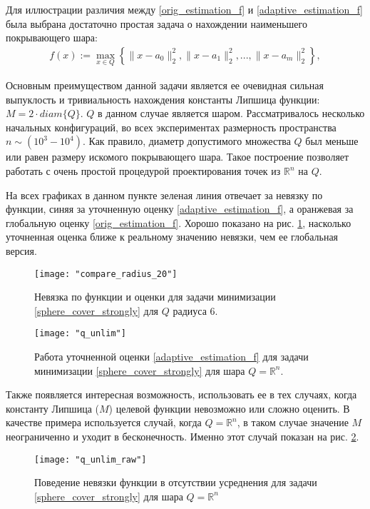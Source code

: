 Для иллюстрации различия между \eqref{orig_estimation_f} и \eqref{adaptive_estimation_f} была выбрана достаточно простая задача о нахождении наименьшего покрывающего шара:
\begin{gather}\label{sphere_cover_strongly}
    f(x) := \max_{x\in Q}\left\{\|x - a_0\|_2^2, \|x - a_1\|_2^2, ..., \|x - a_m\|_2^2\right\},
\end{gather}

Основным преимуществом данной задачи является ее очевидная сильная выпуклость и тривиальность нахождения константы Липшица функции: $ M = 2 \cdot diam\{Q\} $. $Q$ в данном случае является шаром.
Рассматривалось несколько начальных конфигураций, во всех экспериментах размерность пространства $n \sim (10^3 - 10^4)$. Как правило, диаметр допустимого множества $Q$ был меньше или равен размеру искомого покрывающего шара. Такое построение позволяет работать с очень простой процедурой проектирования точек из $\mathbb{R}^n$ на $Q$.

На всех графиках в данном пункте зеленая линия отвечает за невязку по функции, синяя за уточненную оценку \eqref{adaptive_estimation_f}, а оранжевая за глобальную оценку \eqref{orig_estimation_f}. Хорошо показано на рис. \ref{r_20_q_6}, насколько уточненная оценка ближе к реальному значению невязки, чем ее глобальная версия. 

\begin{figure}[h]
	\centering
	\texttt{[image: "compare\_radius\_20"]}
    \caption{Невязка по функции и оценки для задачи минимизации \eqref{sphere_cover_strongly} для $Q$ радиуса 6.}
    \label{r_20_q_6}
\end{figure}

\begin{figure}[h]
	\centering
	\texttt{[image: "q\_unlim"]}
    \caption{Работа уточненной оценки \eqref{adaptive_estimation_f} для задачи минимизации \eqref{sphere_cover_strongly} для шара $Q = \mathbb{R}^n$.}
    \label{q_unlim}
\end{figure}

Также появляется интересная возможность, использовать ее в тех случаях, когда константу Липшица ($M$) целевой функции невозможно или сложно оценить. В качестве примера используется случай, когда $Q = \mathbb{R}^n$, в таком случае значение $M$ неограниченно и уходит в бесконечность. Именно этот случай показан на рис. \ref{q_unlim}. 

\begin{figure}[h]
	\centering
	\texttt{[image: "q\_unlim\_raw"]}
    \caption{Поведение невязки функции в отсутствии усреднения для задачи \eqref{sphere_cover_strongly} для шара $Q = \mathbb{R}^n$}
    \label{non_avg}
\end{figure}

